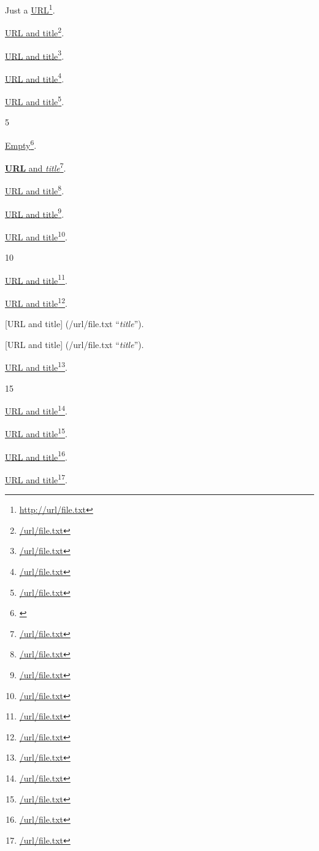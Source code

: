 
\def\mytitle{Inline Links}


Just a \href{http://url/file.txt}{URL}\footnote{\href{http://url/file.txt}{http:\slash{}\slash{}url\slash{}file.txt}}.

\href{/url/file.txt}{URL and title}\footnote{\href{/url/file.txt}{\slash{}url\slash{}file.txt}}.

\href{/url/file.txt}{URL and title}\footnote{\href{/url/file.txt}{\slash{}url\slash{}file.txt}}.

\href{/url/file.txt}{URL and title}\footnote{\href{/url/file.txt}{\slash{}url\slash{}file.txt}}.

\href{/url/file.txt}{URL and title}\footnote{\href{/url/file.txt}{\slash{}url\slash{}file.txt}}.

5

\href{}{Empty}\footnote{\href{}{}}.

\href{/url/file.txt}{\textbf{URL} and \emph{title}}\footnote{\href{/url/file.txt}{\slash{}url\slash{}file.txt}}.

\href{/url/file.txt}{URL and title}\footnote{\href{/url/file.txt}{\slash{}url\slash{}file.txt}}.

\href{/url/file.txt}{URL and title}\footnote{\href{/url/file.txt}{\slash{}url\slash{}file.txt}}.

\href{/url/file.txt}{URL and title}\footnote{\href{/url/file.txt}{\slash{}url\slash{}file.txt}}.

10

\href{/url/file.txt}{URL and title}\footnote{\href{/url/file.txt}{\slash{}url\slash{}file.txt}}.

\href{/url/file.txt}{URL and title}\footnote{\href{/url/file.txt}{\slash{}url\slash{}file.txt}}.

{[URL and title]} (\slash{}url\slash{}file.txt ``\emph{title}'').

{[URL and title]}
(\slash{}url\slash{}file.txt ``\emph{title}'').

\href{/url/file.txt}{URL and title}\footnote{\href{/url/file.txt}{\slash{}url\slash{}file.txt}}.

15

\href{/url/file.txt}{URL and title}\footnote{\href{/url/file.txt}{\slash{}url\slash{}file.txt}}.

\href{/url/file.txt}{URL and title}\footnote{\href{/url/file.txt}{\slash{}url\slash{}file.txt}}.

\href{/url/file.txt}{URL and title}\footnote{\href{/url/file.txt}{\slash{}url\slash{}file.txt}}.

\href{/url/file.txt}{URL and title}\footnote{\href{/url/file.txt}{\slash{}url\slash{}file.txt}}.



